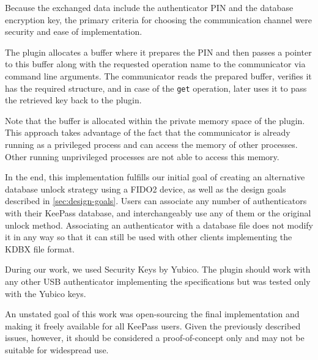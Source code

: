 Because the exchanged data include the authenticator PIN and the database encryption key,
the primary criteria for choosing the communication channel were security and ease of implementation.

The plugin allocates a buffer where it prepares the PIN and then passes a pointer to this buffer
along with the requested operation name to the communicator via command line arguments. The communicator
reads the prepared buffer, verifies it has the required structure, and in case of the \texttt{get}
operation, later uses it to pass the retrieved key back to the plugin.

Note that the buffer is allocated within the private memory space of the plugin. This approach takes advantage
of the fact that the communicator is already running as a privileged process and can access the
memory of other processes. Other running unprivileged processes are not able to access this memory.

In the end, this implementation fulfills our initial goal of creating an alternative database unlock strategy
using a FIDO2 device, as well as the design goals described in \autoref{sec:design-goals}. Users can
associate any number of authenticators with their KeePass database, and interchangeably use any of them
or the original unlock method. Associating an authenticator with a database file does not modify it in any way
so that it can still be used with other clients implementing the KDBX file format.

During our work, we used Security Keys by Yubico. The plugin should work
with any other USB authenticator implementing the specifications but was tested only with
the Yubico keys.

An unstated goal of this work was open-sourcing the final implementation and making it freely
available for all KeePass users. Given the previously described issues, however, it should be considered
a proof-of-concept only and may not be suitable for widespread use.
